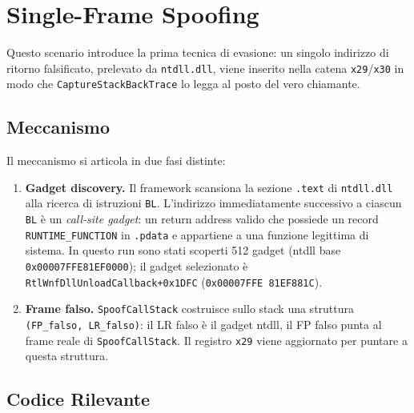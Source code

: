 
\section{Single-Frame Spoofing}
\label{sec:sc2}

Questo scenario introduce la prima tecnica di evasione: un singolo indirizzo di
ritorno falsificato, prelevato da \texttt{ntdll.dll}, viene inserito nella catena
\texttt{x29}/\texttt{x30} in modo che \texttt{CaptureStackBackTrace} lo legga al
posto del vero chiamante.

\subsection{Meccanismo}

Il meccanismo si articola in due fasi distinte:

\begin{enumerate}
  \item \textbf{Gadget discovery.} Il framework scansiona la sezione
        \texttt{.text} di \texttt{ntdll.dll} alla ricerca di istruzioni
        \texttt{BL}. L'indirizzo immediatamente successivo a ciascun
        \texttt{BL} è un \emph{call-site gadget}: un return address valido
        che possiede un record \texttt{RUNTIME\_FUNCTION} in \texttt{.pdata}
        e appartiene a una funzione legittima di sistema.
        In questo run sono stati scoperti 512 gadget (ntdll base
        \texttt{0x00007FFE81EF0000}); il gadget selezionato è
        \texttt{RtlWnfDllUnloadCallback+0x1DFC}
        (\texttt{0x00007FFE\,81EF881C}).

  \item \textbf{Frame falso.} \texttt{SpoofCallStack} costruisce sullo stack
        una struttura \texttt{(FP\_falso, LR\_falso)}: il LR falso è il
        gadget ntdll, il FP falso punta al frame reale di
        \texttt{SpoofCallStack}. Il registro \texttt{x29} viene aggiornato
        per puntare a questa struttura.
\end{enumerate}

\subsection{Codice Rilevante}



